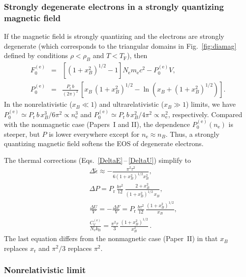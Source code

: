 \documentclass[traditabstract]{aa}
\newcommand{\bea}{\begin{eqnarray}}
\newcommand{\eea}{\end{eqnarray}}
\newcommand{\mel}{m_\mathrm{e}}
\newcommand{\nel}{n_\mathrm{e}}
\newcommand{\Nel}{N_\mathrm{e}}
\newcommand{\kB}{k_\mathrm{B}}
\newcommand{\Prel}{P_\mathrm{r}}
\newcommand{\TF}{T_\mathrm{F}}
\newcommand{\xr}{x_\mathrm{r}}
\begin{document}
\subsubsection{Strongly degenerate electrons in a strongly
quantizing magnetic field} 

If the magnetic field is strongly quantizing
and the electrons are strongly degenerate
(which corresponds to the triangular domains in
Fig.~\ref{fig:diamag} defined by conditions $\rho<\rho_B$
and $T<\TF$),
then
\bea
   F_0^\mathrm{(e)} &=& \left[(1+x_B^2)^{1/2} - 1\right]
         \Nel\mel c^2 - P_0^\mathrm{(e)} V,
\\
   P_0^\mathrm{(e)} &=& \frac{\Prel\,b}{(2\pi)^2}\,
        \left[
          x_B\,(1+x_B^2)^{1/2}
           - \ln\left(x_B+(1+x_B^2)^{1/2}\right)
            \right] .
\label{P-mag-simple}
\eea
In the nonrelativistic ($x_B\ll1$) and ultrarelativistic
($x_B\gg1$) limits, we have $P_0^\mathrm{(e)}\simeq\Prel\,
b\, x_B^3/6\pi^2 \propto \nel^3$ and
$P_0^\mathrm{(e)}\simeq\Prel\, b\, x_B^2/4\pi^2 \propto
\nel^2$, respectively. Compared with the nonmagnetic 
case (Papers~I and II), the dependence $P_0^\mathrm{(e)}(\nel)$
is steeper, but $P$ is lower everywhere except  for
$\nel\approx n_B$. Thus, a strongly quantizing
magnetic field softens the EOS of degenerate electrons.

The thermal corrections (Eqs.~\ref{DeltaE}\,--\,\ref{DeltaU})
simplify to
\bea&&
\Delta\tilde\epsilon
\approx
- \frac{\pi^2\tau^2}{6(1+x_B^2)^{1/2} x_B^2},
\\&&
\Delta P = \Prel \, \frac{b \tau^2}{12}\,
 \frac{2+x_B^2}{(1+x_B^2)^{1/2}\, x_B^{\phantom{2}}},
\\&&
\frac{\Delta U}{V} = -\frac{\Delta F}{V}
 = \Prel \,\frac{b \tau^2}{12}\, \frac{(1+x_B^2)^{1/2}}{x_B},
\\&&
\frac{C_V^\mathrm{(e)} }{ \Nel\kB} =
\frac{\pi^2\tau}{3}\,\frac{(1+x_B^2)^{1/2}}{x_B^2}\,.
\eea
The last
equation differs from the nonmagnetic case (Paper~II)
in that $x_B$ replaces $\xr$ and $\pi^2/3$ replaces
$\pi^2$.

\subsubsection{Nonrelativistic limit}
\end{document}
